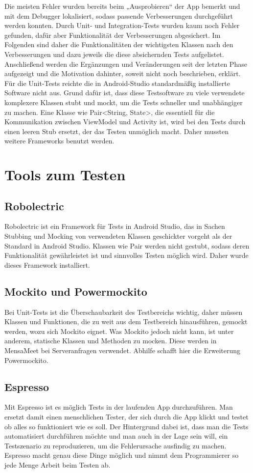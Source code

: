 \documentclass[a4paper]{scrreprt}
\begin{document}
Die meisten Fehler wurden bereits beim „Ausprobieren“ der App bemerkt und mit dem Debugger lokalisiert, sodass passende Verbesserungen durchgeführt werden konnten. Durch Unit- und Integration-Tests wurden kaum noch Fehler gefunden, dafür aber Funktionalität der Verbesserungen abgesichert. Im Folgenden sind daher die Funktionalitäten der wichtigsten Klassen nach den Verbesserungen und dazu jeweils die diese absichernden Tests aufgelistet. Anschließend werden die Ergänzungen und Veränderungen seit der letzten Phase aufgezeigt und die Motivation dahinter, soweit nicht noch beschrieben, erklärt.
Für die Unit-Tests reichte die in Android-Studio standardmäßig installierte Software nicht aus. Grund dafür ist, dass diese Testsoftware zu viele verwendete komplexere Klassen stubt und mockt, um die Tests schneller und unabhängiger zu machen. Eine Klasse wie Pair<String, State>, die essentiell für die Kommunikation zwischen ViewModel und Activity ist, wird bei den Tests durch einen leeren Stub ersetzt, der das Testen unmöglich macht. Daher mussten weitere Frameworks benutzt werden.

\section{Tools zum Testen}

\subsection{Robolectric}
Robolectric ist ein Framework für Tests in Android Studio, das in Sachen Stubbing und Mocking von verwendeten Klassen geschickter vorgeht als der Standard in Android Studio. Klassen wie Pair werden nicht gestubt, sodass deren Funktionalität gewährleistet ist und sinnvolles Testen möglich wird. Daher wurde dieses Framework installiert.

\subsection{Mockito und Powermockito}
Bei Unit-Tests ist die Überschaubarkeit des Testbereichs wichtig, daher müssen Klassen und Funktionen, die zu weit aus dem Testbereich hinausführen, gemockt werden, wozu sich Mockito eignet. Was Mockito jedoch nicht kann, ist unter anderem, statische Klassen und Methoden zu mocken. Diese werden in MensaMeet bei Serveranfragen verwendet. Abhilfe schafft hier die Erweiterung Powermockito.

\subsection{Espresso}
Mit Espresso ist es möglich Tests in der laufenden App durchzuführen. Man ersetzt damit einen menschlichen Tester, der sich durch die App klickt und testet ob alles so funktioniert wie es soll. Der Hintergrund dabei ist, dass man die Tests automatisiert durchführen möchte und man auch in der Lage sein will, ein Testszenario zu reproduzieren, um die Fehlerursache ausfindig zu machen. Espresso macht genau diese Dinge möglich und nimmt dem Programmierer so jede Menge Arbeit beim Testen ab.
\end{document}

